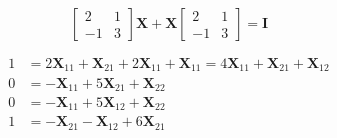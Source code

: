 \documentclass[10pt]{book}
\begin{document}
\begin{mdSnippets}
\begin{mdDisplaySnippet}[4e23e72fba9e156fd29054eb3d993594]
\end{mdDisplaySnippet}%
\begin{mdDisplaySnippet}%
\begin{mdDiv}[class={mathdisplay,math-display},color={},math-needpdf={}]%
\[%
\begin{bmatrix}2 & 1 \\ -1 & 3 \end{bmatrix} \mathbf{X} + \mathbf{X} \begin{bmatrix} 2 & 1 \\ -1 & 3 \end{bmatrix} = \mathbf{I}
\]%
\end{mdDiv}%

\end{mdDisplaySnippet}%
\begin{mdDisplaySnippet}[b1f6ae96be6af91159360da22101f63f]%
\begin{mdDiv}[class={mathdisplay,math-display},color={},math-needpdf={}]%
\[%
\begin{aligned}
1 &= 2 \mathbf{X}_{11} + \mathbf{X}_{21} + 2 \mathbf{X}_{11} + \mathbf{X}_{11} = 4 \mathbf{X}_{11} + \mathbf{X}_{21} + \mathbf{X}_{12} \\
0 &= - \mathbf{X}_{11} + 5 \mathbf{X}_{21} + \mathbf{X}_{22} \\
0 &= - \mathbf{X}_{11} + 5 \mathbf{X}_{12} + \mathbf{X}_{22} \\
1 &= - \mathbf{X}_{21} - \mathbf{X}_{12} + 6 \mathbf{X}_{21}
\end{aligned}
\]%
\end{mdDiv}%


\end{mdDisplaySnippet}
\end{mdSnippets}
\end{document}
